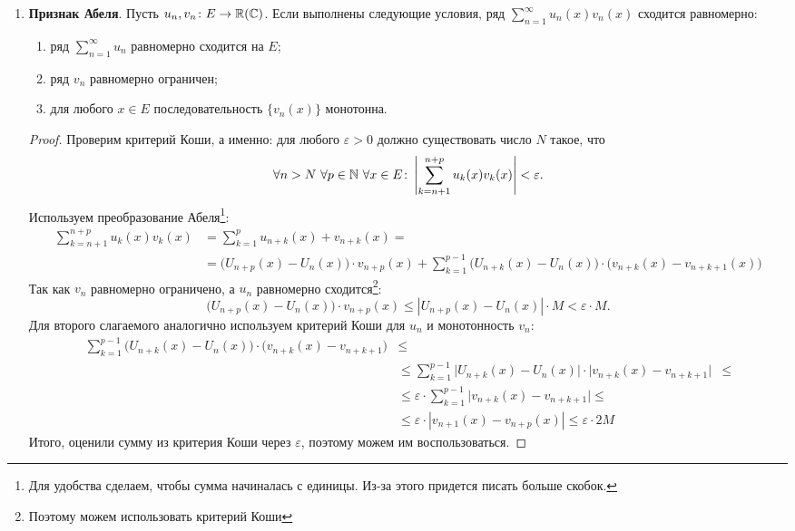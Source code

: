 \begin{prop}
\begin{enumerate}
\begin{ex}
			\end{ex}
		\item {\bf Признак Абеля}.  Пусть $ u_n, v_n \colon E \to \mathbb{R}(\mathbb{C})$. Если выполнены следующие условия, ряд $ \sum_{n=1}^{\infty} u_n(x)v_n(x)$ сходится равномерно:
			\begin{enumerate}[noitemsep]
				\item ряд $ \sum_{n=1}^{\infty} u_n$ равномерно сходится на $ E$; 
				\item ряд $ v_n$ равномерно ограничен;
				\item для любого $ x \in E$ последовательность $ \{v_n(x)\}$ монотонна.
			\end{enumerate} 
			\begin{proof}
			    Проверим критерий Коши, а именно: для любого $ \varepsilon >0$ должно существовать число $ N$ такое, что 
				 \[
					 \forall n > N ~ \forall p \in \mathbb{N} ~ \forall x \in E\colon \left|   \sum_{k=n+1}^{n+p} u_k(x)v_k(x)  \right| < \varepsilon 
				.\] 
				Используем преобразование Абеля\footnote{Для удобства сделаем, чтобы сумма начиналась с единицы. Из-за этого придется писать больше скобок.}:
				\[
				\begin{aligned}
					\sum_{k=n+1}^{n+p}u_k (x)v_k(x) &= \sum_{k=1}^{p} u_{n+k}(x) + v_{n+k}(x) =\\
									   &= \bigl( U_{n+p}(x) - U_{n}(x) \bigr)\cdot  v_{n+p}(x) + \sum_{k=1}^{p-1} \bigl( U_{n+k}(x) - U_n(x) \bigr) \cdot \bigl( v_{n+k}(x)-v_{n+k+1}(x) \bigr) 
				\end{aligned}
				\]
				Так как $ v_n$ равномерно ограничено, а $ u_n $ равномерно сходится\footnote{Поэтому можем использовать критерий Коши}:
				\[
					\bigl(U_{n+p}(x) - U_n(x)\bigr)\cdot v_{n+p}(x) \le \left| U_{n+p}(x) - U_n(x) \right| \cdot M < \varepsilon \cdot M
				.\]
				Для второго слагаемого аналогично используем критерий Коши для $ u_n$ и монотонность  $ v_n$:
				 \[
					 \begin{aligned}
						 \sum_{k=1}^{p-1} \bigl(U_{n+k}(x) - U_n(x)\bigr) \cdot \bigl(v_{n+k}(x) - v_{n+k+1}\bigr) &\le \\
																												   & \le \sum_{k=1}^{p-1} \bigl|U_{n+k}(x) - U_n(x)\bigr| \cdot \bigl|v_{n+k}(x) - v_{n+k+1}\bigr| &\le \\
																												   & \le \varepsilon \cdot \sum_{k=1}^{p-1} \bigl|v_{n+k}(x) - v_{n+k+1}\bigr| \le \\
																												   & \le \varepsilon \cdot \left| v_{n+1}(x) - v_{n+p}(x) \right|  \le \varepsilon \cdot 2 M
					 \end{aligned}
				\] 
				Итого, оценили сумму из критерия Коши через $ \varepsilon $, поэтому можем им воспользоваться.
			\end{proof}
	\end{enumerate} 
\end{prop}

